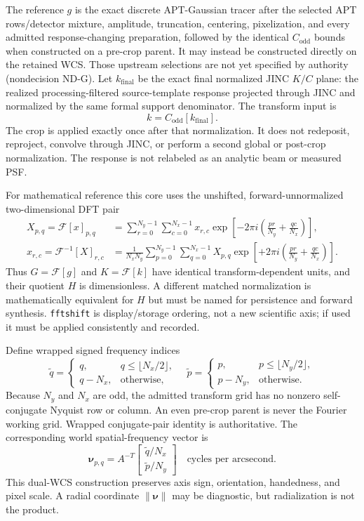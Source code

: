\documentclass[11pt]{article}
\newcommand{\FFT}{\mathcal{F}}
\newcommand{\IFFT}{\mathcal{F}^{-1}}
\begin{document}
The reference $g$ is the exact discrete APT-Gaussian tracer after the selected
APT rows/detector mixture, amplitude, truncation, centering, pixelization, and
every admitted response-changing preparation, followed by the identical
$C_{\mathrm{odd}}$ bounds when constructed on a pre-crop parent.  It may
instead be constructed directly on the retained WCS.  Those upstream
selections are not yet specified by authority (nondecision ND-G).  Let
$k_{\mathrm{final}}$ be the exact final normalized JINC $K/C$ plane: the
realized processing-filtered source-template response projected through JINC
and normalized by the same formal support denominator.  The transform input is
\[
 k=C_{\mathrm{odd}}[k_{\mathrm{final}}].
\]
The crop is applied exactly once after that normalization.  It does not
redeposit, reproject, convolve through JINC, or perform a second global or
post-crop normalization.  The response is not relabeled as an analytic beam or
measured PSF.

For mathematical reference this core uses the unshifted, forward-unnormalized
two-dimensional DFT pair
\begin{align}
 X_{p,q}=\FFT[x]_{p,q}
 &=\sum_{r=0}^{N_y-1}\sum_{c=0}^{N_x-1}
 x_{r,c}\exp\!\left[-2\pi i\left(\frac{pr}{N_y}+\frac{qc}{N_x}\right)\right],\\
 x_{r,c}=\IFFT[X]_{r,c}
 &=\frac{1}{N_xN_y}\sum_{p=0}^{N_y-1}\sum_{q=0}^{N_x-1}
 X_{p,q}\exp\!\left[+2\pi i\left(\frac{pr}{N_y}+\frac{qc}{N_x}\right)\right].
\end{align}
Thus $G=\FFT[g]$ and $K=\FFT[k]$ have identical transform-dependent units,
and their quotient $H$ is dimensionless.  A different matched normalization
is mathematically equivalent for $H$ but must be named for persistence and
forward synthesis.  \texttt{fftshift} is display/storage ordering, not a new
scientific axis; if used it must be applied consistently and recorded.

Define wrapped signed frequency indices
\[
 \widetilde q=\begin{cases}q,&q\leq\lfloor N_x/2\rfloor,\\q-N_x,&\text{otherwise},\end{cases}
 \quad
 \widetilde p=\begin{cases}p,&p\leq\lfloor N_y/2\rfloor,\\p-N_y,&\text{otherwise}.
 \end{cases}
\]
Because $N_y$ and $N_x$ are odd, the admitted transform grid has no nonzero
self-conjugate Nyquist row or column.  An even pre-crop parent is never the
Fourier working grid.  Wrapped conjugate-pair identity is authoritative.  The
corresponding world
spatial-frequency vector is
\[
 \boldsymbol\nu_{p,q}=A^{-T}
 \begin{bmatrix}\widetilde q/N_x\\\widetilde p/N_y\end{bmatrix}
 \quad\text{cycles per arcsecond}.
\]
This dual-WCS construction preserves axis sign, orientation, handedness, and
pixel scale.  A radial coordinate $\|\boldsymbol\nu\|$ may be diagnostic, but
radialization is not the product.
\end{document}
